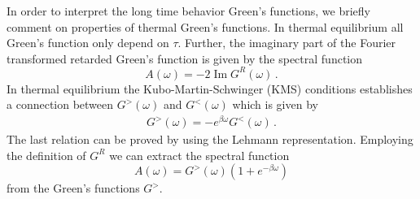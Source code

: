 \documentclass[prx,aps,onecolumn,amsfonts,showpacs,superscriptaddress,preprint,eqsecnum]
{revtex4-1}
\begin{document}

In order to interpret the long time behavior Green's functions, we briefly comment on
properties of thermal Green's functions. In thermal equilibrium all Green's function only depend on $\tau$.
Further, the imaginary part of the Fourier transformed retarded Green's function is given by the spectral function
\begin{equation}
	A(\omega) = -2 \operatorname{Im} G^R(\omega)\, . %
\end{equation}
In thermal equilibrium the Kubo-Martin-Schwinger (KMS) conditions \cite{KamenevBook} establishes a 
connection between $G^>(\omega)$ and $G^{<}(\omega)$ which is given by
\begin{align}
    G^{>}(\omega) = -e^{\beta \omega} G^{<}(\omega) \,. 
\end{align}
The last relation can be proved by using the Lehmann representation. Employing the definition of $G^R$  
we can extract the spectral function 
\begin{equation}
	A(\omega) =   G^>(\omega) (1 + e^{-\beta \omega})
\end{equation}
from the Green's functions $G^{>}$. 
\end{document}
